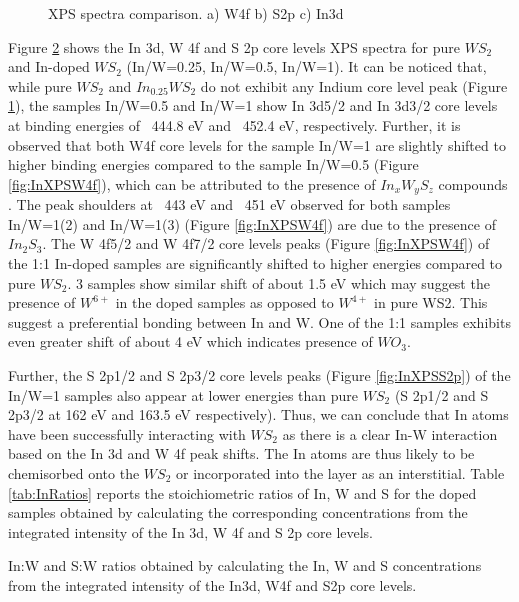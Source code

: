 \begin{figure}[!h]
\begin{center}
\begin{subfigure}[b]{1\textwidth}
			\label{fig:InXPSIn3d}
		\end{subfigure}
		\caption{XPS spectra comparison. a) W4f b) S2p c) In3d}
		\label{fig:InXPSSpectra}
	\end{center}
\end{figure}

Figure \ref{fig:InXPSSpectra} shows the In 3d, W 4f and S 2p core levels XPS spectra for pure $WS_2$ and In-doped $WS_2$ (In/W=0.25, In/W=0.5, In/W=1). It can be noticed that, while pure $WS_2$ and $In_{0.25}WS_2$ do not exhibit any Indium core level peak (Figure \ref{fig:InXPSIn3d}), the samples In/W=0.5 and In/W=1 show In 3d5/2 and In 3d3/2 core levels at binding energies of ~444.8 eV and ~452.4 eV, respectively. Further, it is observed that both W4f core levels for the sample In/W=1 are slightly shifted to higher binding energies compared to the sample In/W=0.5 (Figure \ref{fig:InXPSW4f}), which can be attributed to the presence of $In_xW_yS_z$ compounds \cite{Wagner1991}. The peak shoulders at ~443 eV and ~451 eV observed for both samples In/W=1(2) and In/W=1(3) (Figure \ref{fig:InXPSW4f}) are due to the presence of $In_2S_3$. The W 4f5/2 and W 4f7/2 core levels peaks (Figure \ref{fig:InXPSW4f}) of the 1:1 In-doped samples are significantly shifted to higher energies compared to pure $WS_2$. 3 samples show similar shift of about 1.5 eV which may suggest the presence of $W^{6+}$ in the doped samples as opposed to $W^{4+}$ in pure WS2. This suggest a preferential bonding between In and W. One of the 1:1 samples exhibits even greater shift of about 4 eV which indicates presence of $WO_3$. 

Further, the S 2p1/2 and S 2p3/2 core levels peaks (Figure \ref{fig:InXPSS2p}) of the In/W=1 samples also appear at lower energies than pure $WS_2$ (S 2p1/2 and S 2p3/2 at 162 eV and 163.5 eV respectively). Thus, we can conclude that In atoms have been successfully interacting with $WS_2$ as there is a clear In-W interaction based on the In 3d and W 4f peak shifts. The In atoms are thus likely to be chemisorbed onto the $WS_2$ or incorporated into the layer as an interstitial. Table \ref{tab:InRatios} reports the stoichiometric ratios of In, W and S for the doped samples obtained by calculating the corresponding concentrations from the integrated intensity of the In 3d, W 4f and S 2p core levels. 

\begin{table}[!ht]
\caption{In:W and S:W ratios obtained by calculating the In, W and S concentrations from the integrated intensity of the In3d, W4f and S2p core levels.}
\label{tab:InRatios}
\end{table}

